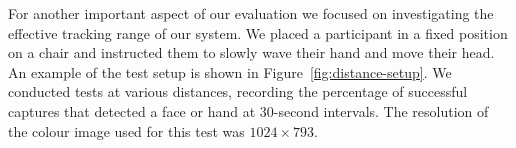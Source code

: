 \begin{invisBox}
    \hfill
\end{invisBox}


For another important aspect of our evaluation we focused on investigating the effective tracking range of our system. We placed a participant in a fixed position on a chair and instructed them to slowly wave their hand and move their head. An example of the test setup is shown in Figure~\ref{fig:distance-setup}. We conducted tests at various distances, recording the percentage of successful captures that detected a face or hand at 30-second intervals. The resolution of the colour image used for this test was $1024 \times 793$.

